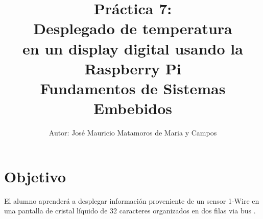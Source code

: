 \documentclass[letterpaper,10.5pt]{article}
\author{\footnotesize Autor: José Mauricio Matamoros de Maria y Campos}
\title{Práctica 7:\\Desplegado de temperatura\\en un display digital usando la Raspberry Pi\\
{\large Fundamentos de Sistemas Embebidos}}
\date{}
\begin{document}
\maketitle

\section{Objetivo}%
\label{sec:objective}
El alumno aprenderá a desplegar información proveniente de un sensor 1-Wire en una pantalla de cristal líquido de 32 caracteres organizados en dos filas via bus \IIC{}.







\appendix

% 
\end{document}
